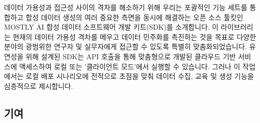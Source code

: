 
데이터 가용성과 접근성 사이의 격차를 해소하기 위해 우리는 포괄적인 기능 세트를 통합하고 합성 데이터 생성의 여러 중요한 측면을 동시에 해결하는 오픈 소스 툴킷인 MOSTLY AI 합성 데이터 소프트웨어 개발 키트(SDK)를 소개합니다.
이 라이브러리는 현재의 데이터 가용성 격차를 메우고 데이터 민주화를 촉진하는 것을 목표로 다양한 분야의 광범위한 연구자 및 실무자에게 접근할 수 있도록 특별히 맞춤화되었습니다.
유연성을 위해 설계된 SDK는 API 호출을 통해 맞춤형으로 개발된 클라우드 기반 서비스에 액세스하여 로컬 또는 '클라이언트 모드'에서 실행할 수 있습니다.
그러나 이 작업에서는 로컬 배포 시나리오에 전적으로 초점을 맞춰 데이터 수집, 교육 및 생성 기능을 심층적으로 제시합니다.


\subsection{기여}

